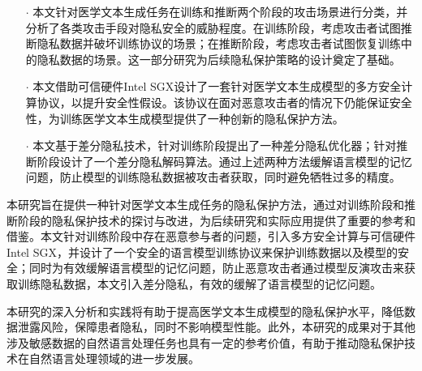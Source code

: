 

\begin{itemize}
	\item [$\cdot$]
	本文针对医学文本生成任务在训练和推断两个阶段的攻击场景进行分类，并分析了各类攻击手段对隐私安全的威胁程度。在训练阶段，考虑攻击者试图推断隐私数据并破坏训练协议的场景；在推断阶段，考虑攻击者试图恢复训练中的隐私数据的场景。这一部分研究为后续隐私保护策略的设计奠定了基础。
	\item [$\cdot$]
	本文借助可信硬件Intel SGX设计了一套针对医学文本生成模型的多方安全计算协议，以提升安全性假设。该协议在面对恶意攻击者的情况下仍能保证安全性，为训练医学文本生成模型提供了一种创新的隐私保护方法。
	\item [$\cdot$]
	本文基于差分隐私技术，针对训练阶段提出了一种差分隐私优化器；针对推断阶段设计了一个差分隐私解码算法。通过上述两种方法缓解语言模型的记忆问题，防止模型的训练隐私数据被攻击者获取，同时避免牺牲过多的精度。
\end{itemize}

本研究旨在提供一种针对医学文本生成任务的隐私保护方法，通过对训练阶段和推断阶段的隐私保护技术的探讨与改进，为后续研究和实际应用提供了重要的参考和借鉴。本文针对训练阶段中存在恶意参与者的问题，引入多方安全计算与可信硬件 Intel SGX，并设计了一个安全的语言模型训练协议来保护训练数据以及模型的安全；同时为有效缓解语言模型的记忆问题，防止恶意攻击者通过模型反演攻击来获取训练隐私数据，本文引入差分隐私，有效的缓解了语言模型的记忆问题。

本研究的深入分析和实践将有助于提高医学文本生成模型的隐私保护水平，降低数据泄露风险，保障患者隐私，同时不影响模型性能。此外，本研究的成果对于其他涉及敏感数据的自然语言处理任务也具有一定的参考价值，有助于推动隐私保护技术在自然语言处理领域的进一步发展。

%
%
%


